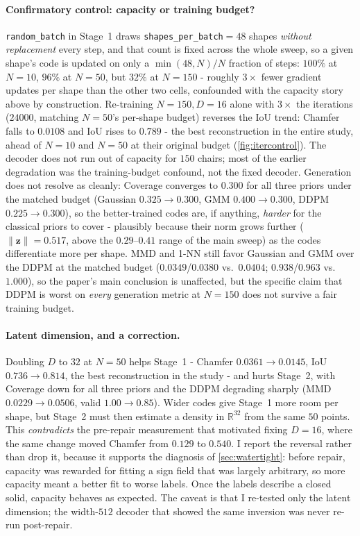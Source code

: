 \documentclass[11pt]{article}
\begin{document}
\paragraph{Confirmatory control: capacity or training budget?}
\texttt{random\_batch} in Stage~1 draws \texttt{shapes\_per\_batch}$=48$ shapes
\emph{without replacement} every step, and that count is fixed across the
whole sweep, so a given shape's code is updated on only a $\min(48,N)/N$
fraction of steps: $100\%$ at $N=10$, $96\%$ at $N=50$, but $32\%$ at $N=150$
- roughly $3\times$ fewer gradient updates per shape than the other two
cells, confounded with the capacity story above by construction. Re-training
$N=150,D=16$ alone with $3\times$ the iterations ($24000$, matching $N=50$'s
per-shape budget) reverses the IoU trend: Chamfer falls to $0.0108$ and IoU
rises to $0.789$ - the best reconstruction in the entire study, ahead of
$N=10$ and $N=50$ at their original budget (\cref{fig:itercontrol}). The decoder does not run out of
capacity for $150$ chairs; most of the earlier degradation was the
training-budget confound, not the fixed decoder. Generation does not resolve
as cleanly: Coverage converges to $0.300$ for all three priors under the
matched budget (Gaussian $0.325\to0.300$, GMM $0.400\to0.300$, DDPM
$0.225\to0.300$), so the better-trained codes are, if anything, \emph{harder}
for the classical priors to cover - plausibly because their norm grows
further ($\lVert\mathbf{z}\rVert=0.517$, above the $0.29$--$0.41$ range of the
main sweep) as the codes differentiate more per shape. MMD and 1-NN still
favor Gaussian and GMM over the DDPM at the matched budget ($0.0349$/$0.0380$
vs.\ $0.0404$; $0.938$/$0.963$ vs.\ $1.000$), so the paper's main conclusion
is unaffected, but the specific claim that DDPM is worst on \emph{every}
generation metric at $N=150$ does not survive a fair training budget.

\paragraph{Latent dimension, and a correction.} Doubling $D$ to $32$ at $N=50$
helps Stage~1 - Chamfer $0.0361 \to 0.0145$, IoU $0.736 \to 0.814$, the best
reconstruction in the study - and hurts Stage~2, with Coverage down for all
three priors and the DDPM degrading sharply (MMD $0.0229 \to 0.0506$, valid $1.00
\to 0.85$). Wider codes give Stage~1 more room per shape, but Stage~2 must then
estimate a density in $\mathbb{R}^{32}$ from the same $50$ points. This
\emph{contradicts} the pre-repair measurement that motivated fixing $D=16$, where
the same change moved Chamfer from $0.129$ to $0.540$. I report the reversal
rather than drop it, because it supports the diagnosis of \cref{sec:watertight}:
before repair, capacity was rewarded for fitting a sign field that was largely
arbitrary, so more capacity meant a better fit to worse labels. Once the labels
describe a closed solid, capacity behaves as expected. The caveat is that I
re-tested only the latent dimension; the width-$512$ decoder that showed the same
inversion was never re-run post-repair.
\end{document}
